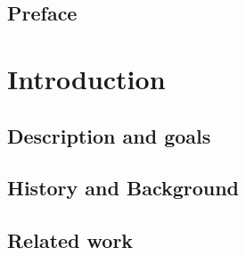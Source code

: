 \documentclass[BSP,english,oneside]{classes/gucthesis}
\begin{document}


\makefrontpages



\clearpage
\setcounter{page}{1}



\chapter*{Preface}
	\label{chap:preface}
	


\tableofcontents
\listoffigures
\listoftables


\newpage
\setcounter{page}{1}
\part{Introduction}
	
		\setcounter{page}{2}	%
		\label{chap:introduction}
		

	\chapter{Description and goals}
		\label{chap:description_goals}
		

		\label{chap:objectives}
		

	\chapter{History and Background}
		\label{chap:background}
		

	\chapter{Related work}
		\label{chap:related_work}
		
\end{document}
